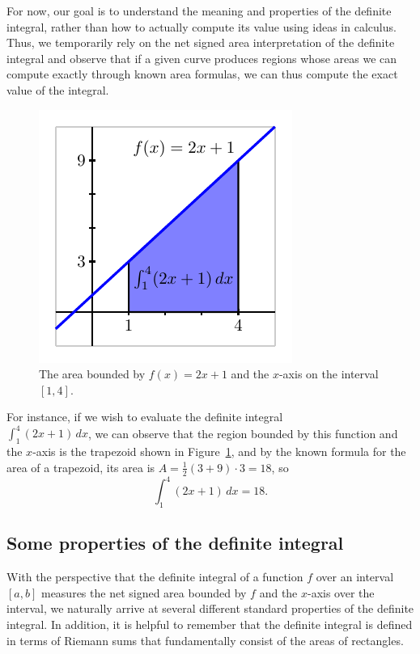 For now, our goal is to understand the meaning and properties of the definite integral, rather than how to actually compute its value using ideas in calculus.  Thus, we temporarily rely on the net signed area interpretation of the definite integral and observe that if a given curve produces regions whose areas we can compute exactly through known area formulas, we can thus compute the exact value of the integral.  
\begin{figure}[h]
\begin{center}
\includegraphics{figures/4_3_TrapArea}
\caption{The area bounded by $f(x)=2x+1$ and the $x$-axis on the interval $[1,4]$.} \label{F:4.3.TrapArea}
\end{center}
\end{figure}
For instance, if we wish to evaluate the definite integral \\ $\int_1^4 (2x+1) \, dx$, we can observe that the region bounded by this function and the $x$-axis is the trapezoid shown in Figure~\ref{F:4.3.TrapArea}, and by the known formula for the area of a trapezoid, its area is $A = \frac{1}{2}(3+9) \cdot 3 = 18$, so
$$\int_1^4 (2x+1) \, dx = 18.$$



\subsection*{Some properties of the definite integral}

With the perspective that the definite integral of a function $f$ over an interval $[a,b]$ measures the net signed area bounded by $f$ and the $x$-axis over the interval, we naturally arrive at several different standard properties of the definite integral.  In addition, it is helpful to remember that the definite integral is defined in terms of Riemann sums that fundamentally consist of the areas of rectangles.

